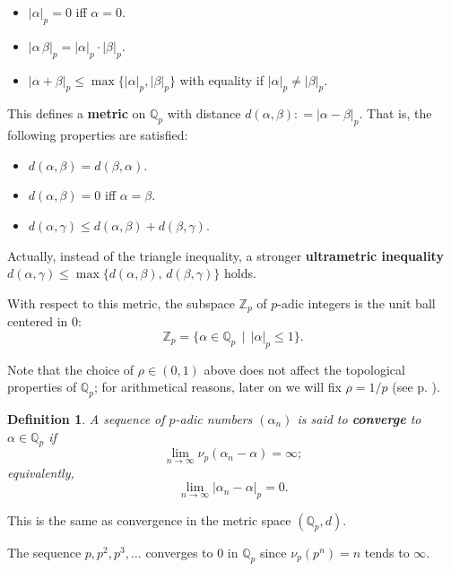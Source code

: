 \documentclass{article}
\newcommand{\term}{\textbf}
\newcommand{\dfn}{\mathrel{\mathop:}=}
\newcommand{\ZZ}{\mathbb{Z}}
\newcommand{\QQ}{\mathbb{Q}}
\newcommand{\examplesymbol}{$\blacktriangle$}
\renewcommand{\qedsymbol}{$\blacksquare$}
\theoremstyle{myplain}
\theoremstyle{mydefinition}
\newtheorem{definition}[proposition]{Definition}
\newenvironment{example}
  {\pushQED{\qed}\renewcommand{\qedsymbol}{\examplesymbol}\examplex}
  {\popQED\endexamplex}
\begin{document}
\begin{itemize}
\item $|\alpha|_p = 0$ iff $\alpha = 0$.

\item $|\alpha\,\beta|_p = |\alpha|_p \cdot |\beta|_p$.

\item $|\alpha+\beta|_p \le \max \{ |\alpha|_p, |\beta|_p \}$ with equality if
  $|\alpha|_p \ne |\beta|_p$.
\end{itemize}

This defines a \term{metric} on $\QQ_p$ with distance
$d (\alpha,\beta) \dfn |\alpha - \beta|_p$. That is, the following properties
are satisfied:

\begin{itemize}
\item $d (\alpha,\beta) = d (\beta,\alpha)$.

\item $d (\alpha,\beta) = 0$ iff $\alpha = \beta$.

\item $d (\alpha,\gamma) \le d (\alpha,\beta) + d (\beta,\gamma)$.
\end{itemize}

Actually, instead of the triangle inequality, a stronger
\term{ultrametric inequality}
$d (\alpha,\gamma) \le \max \{ d (\alpha, \beta), \, d (\beta,\gamma) \}$ holds.

\vspace{1em}

With respect to this metric, the subspace $\ZZ_p$ of $p$-adic integers is the
unit ball centered in $0$:
\[ \ZZ_p = \{ \alpha \in \QQ_p \,\mid\, |\alpha|_p \le 1 \}. \]

Note that the choice of $\rho \in (0,1)$ above does not affect the topological
properties of $\QQ_p$; for arithmetical reasons, later on we will fix
$\rho = 1/p$ (see p. \pageref{theorem:product-formula-Q}).

\begin{definition}
  A sequence of $p$-adic numbers $(\alpha_n)$ is said to \term{converge} to
  $\alpha\in \QQ_p$ if
  $$\lim_{n\to \infty}  \nu_p (\alpha_n - \alpha) = \infty;$$
  equivalently,
  $$\lim_{n\to \infty} |\alpha_n - \alpha|_p = 0.$$
\end{definition}

This is the same as convergence in the metric space $(\QQ_p, d)$.

\begin{example}
  The sequence $p, p^2, p^3, \ldots$ converges to $0$ in $\QQ_p$ since
  $ \nu_p (p^n) = n$ tends to $\infty$.
\end{example}
\end{document}
